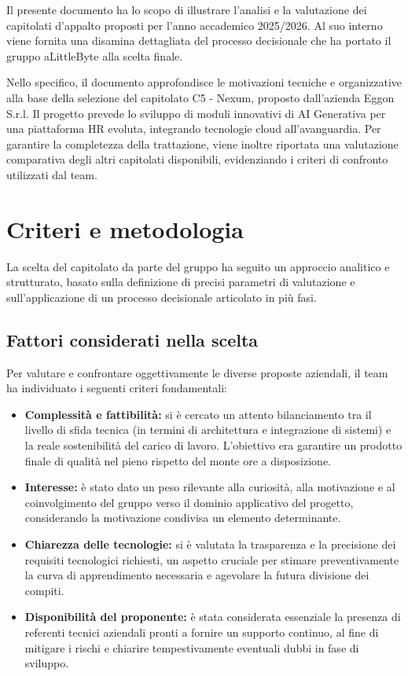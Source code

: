 \documentclass[a4paper,12pt]{article}
\begin{document}
Il presente documento ha lo scopo di illustrare l'analisi e la valutazione dei capitolati d'appalto proposti per l'anno accademico 2025/2026. Al suo interno viene fornita una disamina dettagliata del processo decisionale che ha portato il gruppo aLittleByte alla scelta finale.

Nello specifico, il documento approfondisce le motivazioni tecniche e organizzative alla base della selezione del capitolato C5 - Nexum, proposto dall'azienda Eggon S.r.l. Il progetto prevede lo sviluppo di moduli innovativi di AI Generativa per una piattaforma HR evoluta, integrando tecnologie cloud all'avanguardia. Per garantire la completezza della trattazione, viene inoltre riportata una valutazione comparativa degli altri capitolati disponibili, evidenziando i criteri di confronto utilizzati dal team.

\section{Criteri e metodologia}

La scelta del capitolato da parte del gruppo ha seguito un approccio analitico e strutturato, basato sulla definizione di precisi parametri di valutazione e sull'applicazione di un processo decisionale articolato in più fasi.

\subsection{Fattori considerati nella scelta}

Per valutare e confrontare oggettivamente le diverse proposte aziendali, il team ha individuato i seguenti criteri fondamentali:

\begin{itemize}
    \item \textbf{Complessità e fattibilità:} si è cercato un attento bilanciamento tra il livello di sfida tecnica (in termini di architettura e integrazione di sistemi) e la reale sostenibilità del carico di lavoro. L'obiettivo era garantire un prodotto finale di qualità nel pieno rispetto del monte ore a disposizione.
    \item \textbf{Interesse:} è stato dato un peso rilevante alla curiosità, alla motivazione e al coinvolgimento del gruppo verso il dominio applicativo del progetto, considerando la motivazione condivisa un elemento determinante.
    \item \textbf{Chiarezza delle tecnologie:} si è valutata la trasparenza e la precisione dei requisiti tecnologici richiesti, un aspetto cruciale per stimare preventivamente la curva di apprendimento necessaria e agevolare la futura divisione dei compiti.
    \item \textbf{Disponibilità del proponente:} è stata considerata essenziale la presenza di referenti tecnici aziendali pronti a fornire un supporto continuo, al fine di mitigare i rischi e chiarire tempestivamente eventuali dubbi in fase di sviluppo.
\end{itemize}
\end{document}
